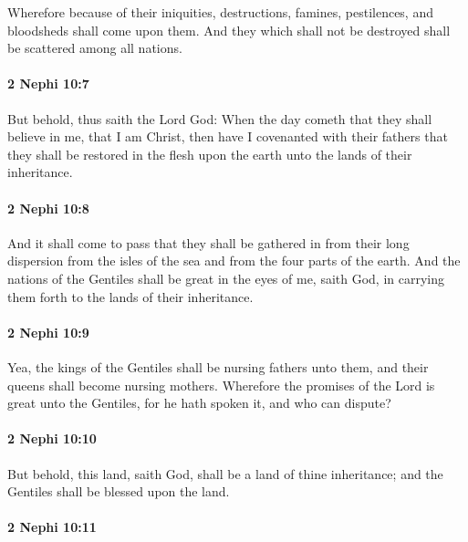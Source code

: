 			Wherefore because of their iniquities,
			destructions, famines, pestilences, and bloodsheds shall come upon them.
			And they which shall not be destroyed shall be scattered among all nations.

		\paragraph{2 Nephi 10:7} %
			\label{2NEPHI-10-7}

			But behold, thus saith the Lord God:
			When the day cometh that they shall believe in me, that I am Christ,
			then have I covenanted with their fathers
			that they shall be restored in the flesh upon the earth
			unto the lands of their inheritance.

		\paragraph{2 Nephi 10:8} %
			\label{2NEPHI-10-8}

			And it shall come to pass that they shall be gathered in
			from their long dispersion from the isles of the sea
			and from the four parts of the earth.
			And the nations of the Gentiles shall be great in the eyes of me, saith God,
			in carrying them forth to the lands of their inheritance.

		\paragraph{2 Nephi 10:9} %
			\label{2NEPHI-10-9}

			Yea, the kings of the Gentiles shall be nursing fathers unto them,
			and their queens shall become nursing mothers.
			Wherefore the promises of the Lord is great unto the Gentiles,
			for he hath spoken it, and who can dispute?

		\paragraph{2 Nephi 10:10} %
			\label{2NEPHI-10-10}

			But behold, this land, saith God, shall be a land of thine inheritance;
			and the Gentiles shall be blessed upon the land.

		\paragraph{2 Nephi 10:11} %
			\label{2NEPHI-10-11}

